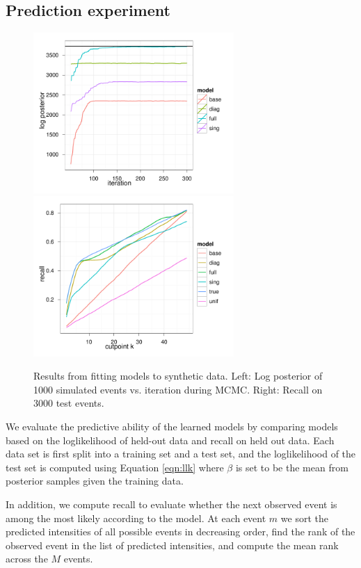 \documentclass[11pt]{article}
\begin{document}
\subsection*{Prediction experiment}

\begin{figure}
\center
\includegraphics[width=3in]{../figs/syn/logposterior.pdf}
\includegraphics[width=3in]{../figs/syn/test-recall.pdf}
\caption{Results from fitting models to synthetic data. Left: Log posterior of 1000 simulated events vs. iteration during MCMC.  Right: Recall on 3000 test events.}
\label{fig:synresults}
\end{figure}
We evaluate the predictive ability of the learned models by comparing models based on the loglikelihood of held-out data and recall on held out data.  Each data set is first split into a training set and a test set, and the loglikelihood of the test set is computed using Equation \ref{eqn:llk} where $\beta$ is set to be the mean from posterior samples given the training data.  

In addition, we compute recall to evaluate whether the next observed event is among the most likely according to the model.  At each event $m$ we sort the predicted intensities of all possible events in decreasing order, find the rank of the observed event in the list of predicted intensities, and compute the mean rank across the $M$ events.  
\end{document}
